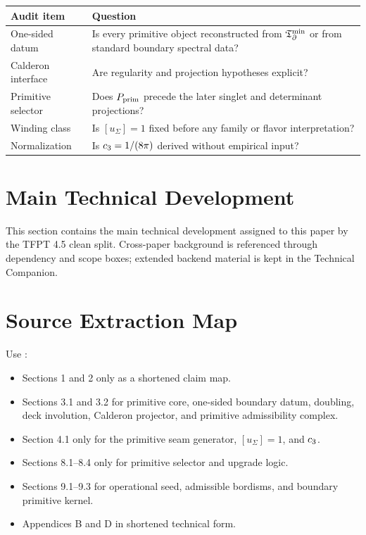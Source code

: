 \documentclass[11pt,a4paper]{article}
\begin{document}
\begin{center}
\begin{tabularx}{\textwidth}{@{}p{}Y@{}}
\toprule
\textbf{Audit item} & \textbf{Question} \\
\midrule
One-sided datum & Is every primitive object reconstructed from $\mathfrak T_{\partial}^{\min}$ or from standard boundary spectral data? \\
Calderon interface & Are regularity and projection hypotheses explicit? \\
Primitive selector & Does $P_{\mathrm{prim}}$ precede the later singlet and determinant projections? \\
Winding class & Is $[u_\Sigma]=1$ fixed before any family or flavor interpretation? \\
Normalization & Is $c_3=1/(8\pi)$ derived without empirical input? \\
\bottomrule
\end{tabularx}
\end{center}

\clearpage
\section{Main Technical Development}

This section contains the main technical development assigned to this paper by the TFPT 4.5 clean split. Cross-paper background is referenced through dependency and scope boxes; extended backend material is kept in the Technical Companion.



\section{Source Extraction Map}

\begin{tfptsourcebox}
Use \sourceDraft:
\begin{itemize}[leftmargin=1.5em]
    \item Sections 1 and 2 only as a shortened claim map.
    \item Sections 3.1 and 3.2 for primitive core, one-sided boundary datum, doubling, deck
    involution, Calderon projector, and primitive admissibility complex.
    \item Section 4.1 only for the primitive seam generator, $[u_\Sigma]=1$, and $c_3$.
    \item Sections 8.1--8.4 only for primitive selector and upgrade logic.
    \item Sections 9.1--9.3 for operational seed, admissible bordisms, and boundary primitive
    kernel.
    \item Appendices B and D in shortened technical form.
\end{itemize}
\end{tfptsourcebox}
\end{document}
